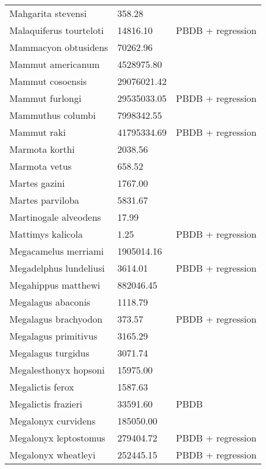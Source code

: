\documentclass{article}
\begin{document}
\begin{center}
\begin{longtable}{p{} p{} p{}}
    Mahgarita stevensi & 358.28 & \cite{Wortman1893} \\ 
    Malaquiferus tourteloti & 14816.10 & PBDB + regression \\ 
    Mammacyon obtusidens & 70262.96 & \cite{Tomiya2013} \\ 
    Mammut americanum & 4528975.80 & \cite{Smith2004} \\ 
    Mammut cosoensis & 29076021.42 & \cite{Secord2008a} \\ 
    Mammut furlongi & 29535033.05 & PBDB + regression \\ 
    Mammuthus columbi & 7998342.55 & \cite{Smith2004} \\ 
    Mammut raki & 41795334.69 & PBDB + regression \\ 
    Marmota korthi & 2038.56 & \cite{Tomiya2013} \\ 
    Marmota vetus & 658.52 & \cite{Tomiya2013} \\ 
    Martes gazini & 1767.00 & \cite{McKenna2011} \\ 
    Martes parviloba & 5831.67 & \cite{Macdonald1951} \\ 
    Martinogale alveodens & 17.99 & \cite{Tomiya2013} \\ 
    Mattimys kalicola & 1.25 & PBDB + regression \\ 
    Megacamelus merriami & 1905014.16 & \cite{Tomiya2013} \\ 
    Megadelphus lundeliusi & 3614.01 & PBDB + regression \\ 
    Megahippus matthewi & 882046.45 & \cite{Tomiya2013} \\ 
    Megalagus abaconis & 1118.79 & \cite{Tomiya2013} \\ 
    Megalagus brachyodon & 373.57 & PBDB + regression \\ 
    Megalagus primitivus & 3165.29 & \cite{Tomiya2013} \\ 
    Megalagus turgidus & 3071.74 & \cite{Tomiya2013} \\ 
    Megalesthonyx hopsoni & 15975.00 & \cite{Hay1916} \\ 
    Megalictis ferox & 1587.63 & \cite{Tomiya2013} \\ 
    Megalictis frazieri & 33591.60 & PBDB \\ 
    Megalonyx curvidens & 185050.00 & \cite{McDonald2005} \\ 
    Megalonyx leptostomus & 279404.72 & PBDB + regression \\ 
    Megalonyx wheatleyi & 252445.15 & PBDB + regression \\ 

\end{longtable}
\end{center}
\end{document}

